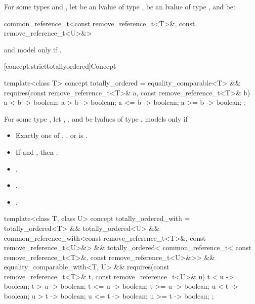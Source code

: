 \begin{itemdescr}
\pnum
For some types  and ,
let  be an lvalue of type ,
 be an lvalue of type ,
and  be:
\begin{codeblock}
common_reference_t<const remove_reference_t<T>&, const remove_reference_t<U>&>
\end{codeblock}
 and  model
 only if
.
\end{itemdescr}

[concept.stricttotallyordered]{Concept }

%
\begin{itemdecl}
template<class T>
  concept totally_ordered =
    equality_comparable<T> &&
    requires(const remove_reference_t<T>& a,
             const remove_reference_t<T>& b) {
      { a <  b } -> boolean;
      { a >  b } -> boolean;
      { a <= b } -> boolean;
      { a >= b } -> boolean;
    };
\end{itemdecl}

\begin{itemdescr}
\pnum
For some type , let , , and  be
lvalues of type .
 models  only if

\begin{itemize}
\item Exactly one of , , or
       is .
\item If  and , then
      .
\item {}.
\item {}.
\item {}.
\end{itemize}

\end{itemdescr}

\begin{itemdecl}
template<class T, class U>
  concept totally_ordered_with =
    totally_ordered<T> && totally_ordered<U> &&
    common_reference_with<const remove_reference_t<T>&, const remove_reference_t<U>&> &&
    totally_ordered<
      common_reference_t<
        const remove_reference_t<T>&,
        const remove_reference_t<U>&>> &&
    equality_comparable_with<T, U> &&
    requires(const remove_reference_t<T>& t,
             const remove_reference_t<U>& u) {
      { t <  u } -> boolean;
      { t >  u } -> boolean;
      { t <= u } -> boolean;
      { t >= u } -> boolean;
      { u <  t } -> boolean;
      { u >  t } -> boolean;
      { u <= t } -> boolean;
      { u >= t } -> boolean;
    };
\end{itemdecl}

